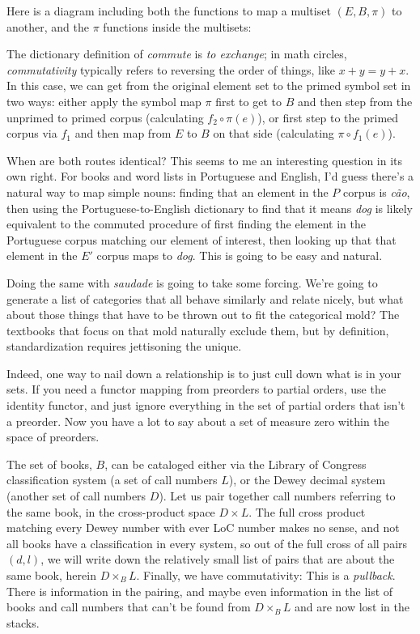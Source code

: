 \documentclass[11pt]{article}
\begin{document}
Here is a diagram including both
 the functions to map a multiset $(E, B, \pi)$ to another, and
the $\pi$ functions inside the multisets:

The dictionary definition of {\em
commute} is {\em to exchange}; in math circles, {\em commutativity} typically refers to
reversing the order of things, like $x+y = y+x$. In this case, we can 
get from the original element set to the primed symbol set in two ways:
either apply the symbol map $\pi$ first to get to $B$ and then step from the unprimed to
primed corpus (calculating $f_2\circ\pi(e)$), or first step to the primed corpus via $f_1$ and then
map from $E$ to $B$ on that side (calculating $\pi\circ f_1(e)$).

When are both routes identical? This seems to me an interesting question in its own right.
For books and word lists in Portuguese and English, I'd guess there's a natural
way to map simple nouns: finding that an element in the $P$ corpus is {\em cão},
then using the Portuguese-to-English dictionary to find that it means {\em dog}
is likely equivalent to the commuted procedure of first finding the element in the
Portuguese corpus matching our element of interest, then looking up that that element in
the $E'$ corpus maps to {\em dog}. This is going to be easy and natural.

Doing the same with {\em saudade} is going to take some forcing.
We're going to generate a list of
categories that all behave similarly and relate nicely, but what about those things
that have to be thrown out to fit the categorical mold? The textbooks that focus on
that mold naturally exclude them, but by definition, standardization requires jettisoning 
the unique.

Indeed, one way to nail down a relationship is to just cull down what is in your sets.
If you need a functor mapping from preorders to partial orders, use the identity functor,
and just ignore everything in the set of partial orders that isn't a preorder. Now you
have a lot to say about a set of measure zero within the space of preorders.

The set of books, $B$, can be cataloged either via the Library of Congress classification system
(a set of call numbers $L$), or the Dewey decimal system (another set of call numbers
$D$). Let us pair together call numbers referring to the same book, in the cross-product
space $D\times L$. The full cross product matching every Dewey number with ever LoC
number makes no sense, and not all books have a classification in every system,
so out of the full cross of all pairs $(d, l)$, we will write down the relatively
small list of pairs that are about the same book, herein $D\times_B L$.  Finally,
we have commutativity:
This is a {\em pullback}. There is information in the pairing, and maybe even
information in the list of books and call numbers that can't be found from $D\times_B L$
and are now lost in the stacks.
\end{document}

